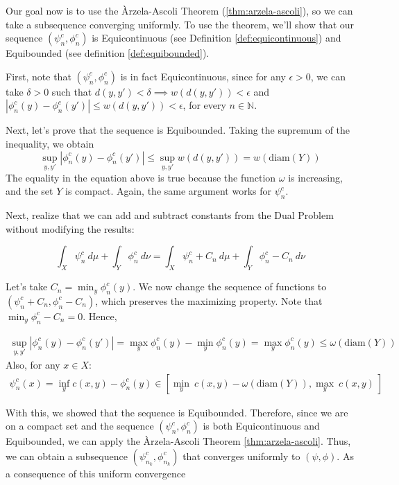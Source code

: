 \begin{prf}
  Our goal now is to use the Àrzela-Ascoli Theorem (\ref{thm:arzela-ascoli}), so
  we can take a subsequence converging uniformly. To use the theorem, we'll
  show that our sequence
  $(\psi^c_n,\phi^c_n)$ is Equicontinuous (see Definition \ref{def:equicontinuous})
  and Equibounded (see definition \ref{def:equibounded}).

  First, note that $(\psi^{c}_n,\phi^c_n)$
  is in fact Equicontinuous, since
  for any $\epsilon > 0$, we can take $\delta >0$ such that
  $d(y,y') < \delta \implies w(d(y,y')) < \epsilon$ and
  $|\phi_n^c(y) - \phi_n^c(y')| \leq w(d(y,y')) < \epsilon$, for every
  $n \in \mathbb N$.
  
  Next, let's prove that the sequence is Equibounded. Taking the supremum of the inequality, we obtain
  \begin{equation*}
    \sup_{y,y'} |\phi^c_n(y) - \phi^c_n(y')| \leq
    \sup_{y,y'}w(d(y,y')) = w(\text{diam}(Y))
  \end{equation*}
  The equality in the equation above is true because the function
  $\omega$ is increasing, and the set $Y$ is compact. Again, the
  same argument works for $\psi_n^c$.

  Next, realize that we can add and subtract constants from
  the Dual Problem without modifying the results:

  \begin{equation*}
    \int_X \psi_n^c \ d\mu + \int_Y \phi_n^c \ d\nu =
    \int_X \psi_n^c + C_n \ d\mu + \int_Y \phi_n^c - C_n \ d\nu
  \end{equation*}

  Let's take $C_n = \min_y \phi_n^c(y)$. We now change the sequence
  of functions to $(\psi_n^c + C_n, \phi_n^c - C_n)$, which preserves
  the maximizing property. Note that $\min_y \phi_n^c - C_n = 0$.
  Hence,

  \begin{align*}
    \sup_{y,y'} |\phi^c_n(y) - \phi^c_n(y')| =
    \max_y \phi_n^c(y) - \min_y \phi_n^c(y) =
    \max_y \phi_n^c(y) \leq \omega(\text{diam}(Y))
  \end{align*}
  Also, for any $x \in X$:
  \begin{align*}
    \psi_n^c(x) = \inf_y c(x,y) - \phi^c_n(y) \in
    [\min_y  \ c(x,y) - \omega(\text{diam}(Y)),\max_y  \ c(x,y) \ ]
  \end{align*}

  With this, we showed that the sequence is Equibounded. Therefore,
  since we are on a compact set and the sequence
  $(\psi_n^c, \phi_n^c)$ is both Equicontinuous and Equibounded,
  we can apply the Àrzela-Ascoli Theorem \ref{thm:arzela-ascoli}.
  Thus, we can obtain a subsequence
  $(\psi_{n_k}^c,\phi_{n_k}^c)$ that converges uniformly to
  $(\psi,\phi)$. As a consequence of this uniform convergence


\end{prf}
